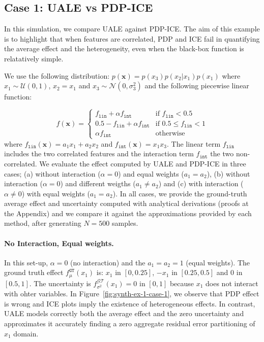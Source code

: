 \documentclass[twoside]{article}
\begin{document}
\subsection{Case 1: UALE vs PDP-ICE}
\label{sec:simulation-examples-1}

In this simulation, we compare UALE against PDP-ICE. The aim of this
example is to highlight that when features are correlated, PDP and ICE
fail in quantifying the average effect and the heterogeneity, even
when the black-box function is relatatively simple.

We use the following distribution:
\(p(\mathbf{x}) = p(x_3)p(x_2|x_1)p(x_1)\) where
\(x_1 \sim \mathcal{U}(0,1)\), \(x_2 = x_1\) and
\(x_3 \sim \mathcal{N}(0, \sigma_3^2)\) and the following piecewise
linear function:

\begin{equation}
  \label{eq:synth-ex-1-function}
  f(\mathbf{x}) = \begin{cases}
                    f_{\mathtt{lin}} + \alpha f_{\mathtt{int}} & \text{if $f_{\mathtt{lin}} < 0.5$ }\\
                    0.5 - f_{\mathtt{lin}} + \alpha f_{\mathtt{int}} & \text{if $0.5 \leq f_{\mathtt{lin}} < 1$}\\
                    \alpha f_{\mathtt{int}} &\text{otherwise}
                  \end{cases}
\end{equation}
%
where \(f_{\mathtt{lin}}(\mathbf{x}) = a_1 x_1 + a_2 x_2\) and
\(f_{\mathtt{int}}(\mathbf{x}) = x_1x_3\). The linear term
\(f_{\mathtt{lin}}\) includes the two correlated features and the
interaction term \(f_{\mathtt{int}}\) the two non-correlated.  We
evaluate the effect computed by UALE and PDP-ICE in three cases; (a)
without interaction (\(\alpha=0\)) and equal weights (\(a_1=a_2\)),
(b) without interaction (\(\alpha=0\)) and different weigths
(\( a_1 \neq a_2 \)) and (c) with interaction (\(\alpha \neq 0\)) with
equal weights (\(a_1=a_2\)). In all cases, we provide the ground-truth
average effect and uncertainty computed with analytical derivations
(proofs at the Appendix) and we compare it against the approximations
provided by each method, after generating \(N=500\) samples.

\paragraph{No Interaction, Equal weights.}

In this set-up, \(\alpha=0\) (no interaction) and the \(a_1=a_2=1\)
(equal weights). The ground truth effect \(f_\mu^{\mathtt{GT}}(x_1)\)
is: \(x_1\) in \([0, 0.25]\), \(-x_1\) in \([0.25, 0.5]\) and \(0\) in
\([0.5, 1]\). The uncertainty is
\(f^{\mathcal{GT}}_{\sigma^2}(x_1) = 0\) in \([0,1]\) because \(x_1\)
does not interact with ohter variables. In
Figure~\ref{fig:synth-ex-1-case-1}, we observe that PDP effect is
wrong and ICE plots imply the existence of heterogeneous effects. In
contrast, UALE models correctly both the average effect and the zero
uncertainty and approximates it accurately finding a zero aggregate
residual error partitioning of \(x_1\) domain.
\end{document}
